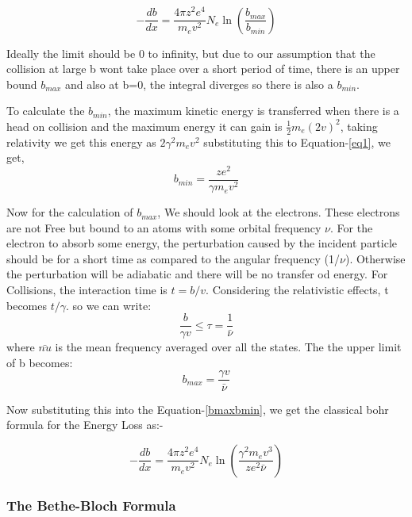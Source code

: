 \documentclass{article}
\begin{document}
\begin{multicols}{2}
\begin{equation}
    -\frac{db}{dx} = \frac{4\pi z^2 e^4}{m_e v^2}N_e \ln{(\frac{b_{max}}{b_{min}})}
    \label{bmaxbmin}
\end{equation}

Ideally the limit should be 0 to infinity, but due to our assumption that
the collision at large b wont take place over a short period of time, there is an upper bound
$b_{max}$ and also at b=0, the integral diverges so there is also a $b_{min}$.

To calculate the $b_{min}$, the maximum kinetic energy is transferred when there is
a head on collision and the maximum energy it can gain is $\frac{1}{2}m_e (2v)^2$,
taking relativity we get this energy as $2\gamma^2 m_e v^2 $
substituting this to Equation-\ref{eq1}, we get,
\begin{equation}
    b_{min} = \frac{ze^2}{\gamma m_e v^2}
\end{equation}



Now for the calculation of $b_{max}$, We should look at the electrons. These electrons are not Free but bound to an atoms with some
orbital frequency $\nu$. For the electron to absorb some energy, the perturbation caused by the incident particle 
should be for a short time as compared to the angular frequency (1/$\nu$). Otherwise the perturbation 
will be adiabatic and there will be no transfer od energy. For Collisions, the interaction time is $t=b/v$. Considering the
relativistic effects, t becomes $t/\gamma$. so we can write:
\begin{equation}
    \frac{b}{\gamma v} \le \tau = \frac{1}{\bar{\nu}}
\end{equation}
where $\bar{nu}$ is the mean frequency averaged over all the states. The the upper limit of b becomes:
\begin{equation}
    b_{max} = \frac{\gamma v}{\bar{\nu}}
\end{equation}

Now substituting this into the Equation-\ref{bmaxbmin}, we get the classical bohr formula for the Energy Loss as:-\cite{leo1988techniques}

\begin{equation}
    -\frac{db}{dx} = \frac{4\pi z^2 e^4}{m_e v^2}N_e \ln{(\frac{\gamma^2 m_e v^3}{z e^2 \bar{\nu}})}
    \label{classicalbohr}
\end{equation}



\subsubsection{The Bethe-Bloch Formula}



\end{multicols}
\end{document}
